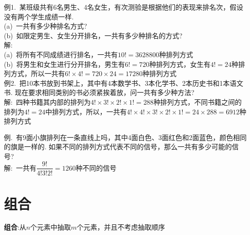 例1.\ 某班级共有6名男生、4名女生，有次测验是根据他们的表现来排名次，假设没有两个学生成绩一样.\\
(a)\ 一共有多少种排名方式?\\
(b)\ 如限定男生、女生分开排名，一共有多少种排名的方式?\\
解:\\
(a)\ 将所有不同成绩进行排名，一共有$10!=3 628 800$种排列方式\\
(b)\ 将男生和女生进行分开排名，男生有$6!=720$种排列方式，女生有$4!=24$种排列方式，所以一共有$6!\times 4!=720\times 24=17280$种排列方式\\[1ex]

例2.\ 把10本书放到书架上，其中有4本数学书、3本化学书、2本历史书和1本语文书. 现在要求相同类别的书必须紧挨着放，问一共有多少种方法?\\
解:\ 四种书籍其内部的排列为$4!\times 3!\times 2!\times 1!=288$种排列方式，不同书籍之间的排列为$4!=24$中排列方式，所以，一共有$4!\times 4!\times 3!\times 2!\times 1!=24\times 288=6912$种排列方式\\[2ex]

{\par\centering
{}
\par}\vspace{2ex}

例.\ 有9面小旗排列在一条直线上吗，其中4面白色、3面红色和2面蓝色，颜色相同的旗是一样的. 如果不同的排列方式代表不同的信号，那么一共有多少可能的信号?\\
解:\ 一共有$\dfrac{9!}{4!3!2!}=1260$种不同的信号\\[2ex]

\section{组合}
\textbf{组合}:从$n$个元素中抽取$m$个元素，并且不考虑抽取顺序\\[2ex]

{\par\centering
{}
\par}\vspace{2ex}

